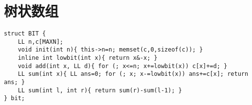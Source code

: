 \section{树状数组}

\begin{lstlisting}
struct BIT {
    LL n,c[MAXN];
    void init(int n){ this->n=n; memset(c,0,sizeof(c)); }
    inline int lowbit(int x){ return x&-x; }
    void add(int x, LL d){ for (; x<=n; x+=lowbit(x)) c[x]+=d; }
    LL sum(int x){ LL ans=0; for (; x; x-=lowbit(x)) ans+=c[x]; return ans; }
    LL sum(int l, int r){ return sum(r)-sum(l-1); }
} bit;
\end{lstlisting}
